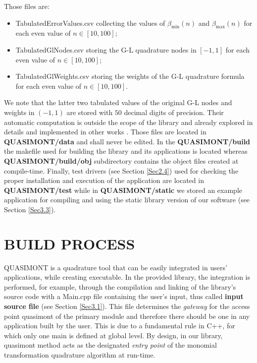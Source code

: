 \documentclass[a4paper, twosided]{book}
\begin{document}
\noindent 
 Those files are:
\begin{itemize}
    \item \colorbox{poliGrayBlue}{TabulatedErrorValues.csv} collecting the values of $\beta_{\text{min}}(n)$ and $\beta_{\text{max}}(n)$ for each even value of $n\in[10,100]$;
    \item \colorbox{poliGrayBlue}{TabulatedGlNodes.csv} storing the G-L quadrature nodes in $[-1,1]$ for each even value of $n\in[10,100]$;
    \item \colorbox{poliGrayBlue}{TabulatedGlWeights.csv} storing the weights of the G-L quadrature formula for each even value of $n\in[10,100]$.
\end{itemize}
We note that the latter two tabulated values of the original G-L nodes and weights in $(-1,1)$ are stored with $50$ decimal digits of precision. Their automatic computation is outside the scope of the library and already explored in details and implemented in other works \cite{Gautschi94,Hale13}. Those files are located in \colorbox{poliGrayBlue}{\textbf{QUASIMONT/data}} and shall never be edited. In the \colorbox{poliGrayBlue}{\textbf{QUASIMONT/build}} the \colorbox{poliGrayBlue}{makefile} used for building the library and its applications is located whereas \colorbox{poliGrayBlue}{\textbf{QUASIMONT/build/obj}} subdirectory contains the object files created at compile-time. Finally, test drivers (see Section \ref{Sec2.4}) used for checking the proper installation and execution of the application are located in \colorbox{poliGrayBlue}{\textbf{QUASIMONT/test}} while in \colorbox{poliGrayBlue}{\textbf{QUASIMONT/static}} we stored an example application for compiling and using the static library version of our software (see Section \ref{Sec3.3}).

\newpage
\section[Build process]{\changefont BUILD PROCESS}\label{Sec2.3}

\noindent
QUASIMONT is a quadrature tool that can be easily integrated in  users' applications, while creating executable. In the provided library, the integration is performed, for example, through the compilation and linking of the library's source code with a \colorbox{poliGrayBlue}{Main.cpp} file containing the user's input, thus called \color{poliDarkBlue} \textbf{input source file} \color{black} (see Section \ref{Sec3.1}). This file determines the {\itshape gateway} for the access point \colorbox{poliGrayBlue}{quasimont} of the primary module and therefore there should be one in any application built by the user. This is due to a fundamental rule in C++, for which only one \colorbox{poliGrayBlue}{main} is defined at global level. By design, in our library, \colorbox{poliGrayBlue}{quasimont} method acts as the designated {\itshape entry point} of the monomial transformation quadrature algorithm at run-time.
\end{document}
